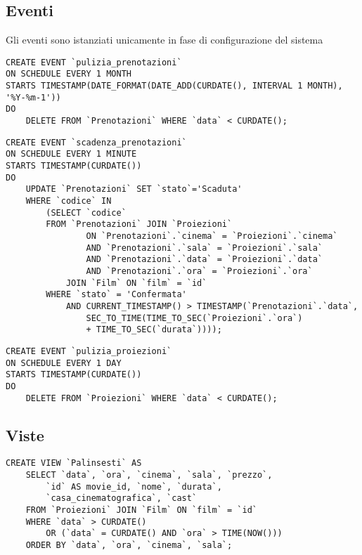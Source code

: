 \pagebreak
\subsection*{Eventi}
%
%

Gli eventi sono istanziati unicamente in fase di configurazione del sistema

\begin{verbatim}
CREATE EVENT `pulizia_prenotazioni`
ON SCHEDULE EVERY 1 MONTH
STARTS TIMESTAMP(DATE_FORMAT(DATE_ADD(CURDATE(), INTERVAL 1 MONTH), '%Y-%m-1'))
DO
    DELETE FROM `Prenotazioni` WHERE `data` < CURDATE();
\end{verbatim}

\begin{verbatim}
CREATE EVENT `scadenza_prenotazioni`
ON SCHEDULE EVERY 1 MINUTE
STARTS TIMESTAMP(CURDATE())
DO
    UPDATE `Prenotazioni` SET `stato`='Scaduta'
    WHERE `codice` IN
        (SELECT `codice`
        FROM `Prenotazioni` JOIN `Proiezioni`
                ON `Prenotazioni`.`cinema` = `Proiezioni`.`cinema`
                AND `Prenotazioni`.`sala` = `Proiezioni`.`sala`
                AND `Prenotazioni`.`data` = `Proiezioni`.`data`
                AND `Prenotazioni`.`ora` = `Proiezioni`.`ora`
            JOIN `Film` ON `film` = `id`
        WHERE `stato` = 'Confermata'
            AND CURRENT_TIMESTAMP() > TIMESTAMP(`Prenotazioni`.`data`,
                SEC_TO_TIME(TIME_TO_SEC(`Proiezioni`.`ora`)
                + TIME_TO_SEC(`durata`))));
\end{verbatim}


\begin{verbatim}
CREATE EVENT `pulizia_proiezioni`
ON SCHEDULE EVERY 1 DAY
STARTS TIMESTAMP(CURDATE())
DO
    DELETE FROM `Proiezioni` WHERE `data` < CURDATE();
\end{verbatim}

\subsection*{Viste}
%
%

\begin{verbatim}
CREATE VIEW `Palinsesti` AS
    SELECT `data`, `ora`, `cinema`, `sala`, `prezzo`,
        `id` AS movie_id, `nome`, `durata`,
        `casa_cinematografica`, `cast`
    FROM `Proiezioni` JOIN `Film` ON `film` = `id`
    WHERE `data` > CURDATE()
        OR (`data` = CURDATE() AND `ora` > TIME(NOW()))
    ORDER BY `data`, `ora`, `cinema`, `sala`;
\end{verbatim}

